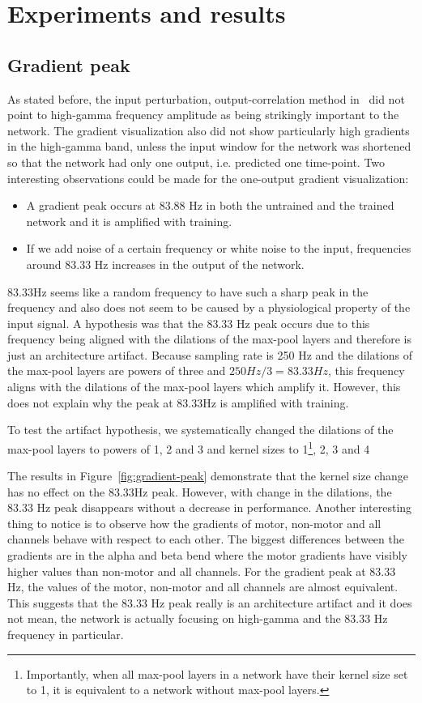 \chapter{Experiments and results}
\label{ch:exp}

\section{Gradient peak}\label{sec:gradient-peak}
As stated before, the input perturbation, output-correlation method in~\cite{Hammer-2021} did not point to high-gamma frequency amplitude as being strikingly important to the network. The gradient visualization also did not show particularly high gradients in the high-gamma band, unless the input window for the network was shortened so that the network had only one output, i.e. predicted one time-point. Two interesting observations could be made for the one-output gradient visualization:
\begin{itemize}
\item[1.] A gradient peak occurs at 83.88 Hz in both the untrained and the trained network and it is amplified with training.
\item[2.] If we add noise of a certain frequency or white noise to the input, frequencies around 83.33 Hz increases in the output of the network.
\end{itemize}

83.33Hz seems like a random frequency to have such a sharp peak in the frequency and also does not seem to be caused by a physiological property of the input signal.
A hypothesis was that the 83.33 Hz peak occurs due to this frequency being aligned with the dilations of the max-pool layers and therefore is just an architecture artifact.
Because sampling rate is 250 Hz and the dilations of the max-pool layers are powers of three and $250Hz/3 = 83.33Hz$, this frequency aligns with the dilations of the max-pool layers which amplify it.
However, this does not explain why the peak at 83.33Hz is amplified with training.

To test the artifact hypothesis, we systematically changed the dilations of the max-pool layers to powers of 1, 2 and 3 and kernel sizes to 1\footnote{Importantly, when all max-pool layers in a network have their kernel size set to 1, it is equivalent to a network without max-pool layers.}, 2, 3 and 4

The results in Figure~\ref{fig:gradient-peak} demonstrate that the kernel size change has no effect on the 83.33Hz peak.
However, with change in the dilations, the 83.33 Hz peak disappears without a decrease in performance.
Another interesting thing to notice is to observe how the gradients of motor, non-motor and all channels behave with respect to each other.
The biggest differences between the gradients are in the alpha and beta bend where the motor gradients have visibly higher values than non-motor and all channels.
For the gradient peak at 83.33 Hz, the values of the motor, non-motor and all channels are almost equivalent.
This suggests that the 83.33 Hz peak really is an architecture artifact and it does not mean, the network is actually focusing on high-gamma and the 83.33 Hz frequency in particular.

